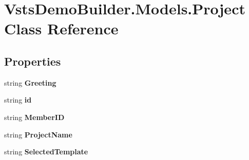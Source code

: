 \hypertarget{class_vsts_demo_builder_1_1_models_1_1_project}{}\section{Vsts\+Demo\+Builder.\+Models.\+Project Class Reference}
\label{class_vsts_demo_builder_1_1_models_1_1_project}
\subsection*{Properties}
\begin{DoxyCompactItemize}
\item 
\mbox{\label{class_vsts_demo_builder_1_1_models_1_1_project_a0c0277935a8686381b5fb9efbbb87cec}} 
string {\bfseries Greeting}
\item 
\mbox{\label{class_vsts_demo_builder_1_1_models_1_1_project_a3a0f333f49c0c1a3156ff23dc0790a45}} 
string {\bfseries id}
\item 
\mbox{\label{class_vsts_demo_builder_1_1_models_1_1_project_abc6e3061b14842b05afbd786031f4930}} 
string {\bfseries Member\+ID}
\item 
\mbox{\label{class_vsts_demo_builder_1_1_models_1_1_project_a8080a638e54e7cd84c855221cde0d9f1}} 
string {\bfseries Project\+Name}
\item 
\mbox{\label{class_vsts_demo_builder_1_1_models_1_1_project_a9fcfe1d053802068f14b42db25a15dbe}} 
string {\bfseries Selected\+Template}
\item 
\mbox{\label{class_vsts_demo_builder_1_1_models_1_1_project_a613c64cebf8d74852c4b887bba2a5c2e}} 

\end{DoxyCompactItemize}
